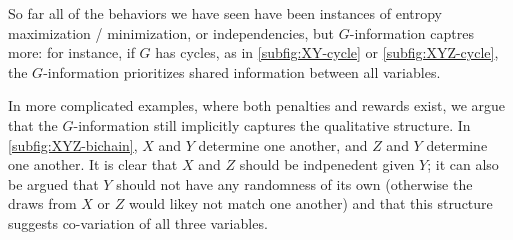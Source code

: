 So far all of the behaviors we have seen have been instances of entropy maximization / minimization, or independencies, but $G$-information captres more: for instance, if $G$ has cycles, as in \ref{subfig:XY-cycle} or \ref{subfig:XYZ-cycle}, the $G$-information prioritizes shared information between all variables. 

In more complicated examples, where both penalties and rewards exist, we argue that the $G$-information still implicitly captures the qualitative structure. In \ref{subfig:XYZ-bichain}, $X$ and $Y$ determine one another, and $Z$ and $Y$ determine one another. It is clear that $X$ and $Z$ should be indpenedent given $Y$; it can also be argued that $Y$ should not have any randomness of its own (otherwise the draws from $X$ or $Z$ would likey not match one another) and that this structure suggests co-variation of all three variables.


